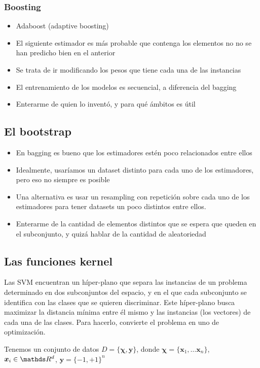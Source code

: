 \documentclass{article}
\begin{document}
\subsubsection{Boosting}
\begin{itemize}
 \item Adaboost (adaptive boosting)
 \item El siguiente estimador es más probable que contenga los elementos no
       no se han predicho bien en el anterior
 \item Se trata de ir modificando los pesos que tiene cada una de las instancias
 \item El entrenamiento de los modelos es secuencial, a diferencia del bagging
 \item Enterarme de quien lo inventó, y para qué ámbitos es útil
\end{itemize}
\subsection{El bootstrap}
\begin{itemize}
 \item En bagging es bueno que los estimadores estén poco relacionados
       entre ellos
 \item Idealmente, usaríamos un dataset distinto para cada uno de los
       estimadores, pero eso no siempre es posible
 \item Una alternativa es usar un resampling con repetición sobre cada
       uno de los estimadores para tener datasets un poco distintos entre ellos.
 \item Enterarme de la cantidad de elementos distintos que se espera que queden
       en el subconjunto, y quizá hablar de la cantidad de aleatoriedad
\end{itemize}
\subsection{Las funciones kernel}
Las SVM encuentran un híper-plano que separa las instancias de un problema
determinado en dos subconjuntos del espacio, y en el que cada subconjunto se
identifica con las clases que se quieren discriminar. Este híper-plano
busca maximizar la distancia mínima entre él mismo y las instancias (los vectores)
de cada una de las clases. Para hacerlo, convierte el problema en uno de
optimización.

Tenemos un conjunto de datos $D = \{\bm{\chi}, \bm{y}\}$, donde $\bm{\chi} = \{\bm{x}_1, \ldots \bm{x}_n\}$, $\bm{x}_i \in \reals^d$, $\bm{y} = \{-1, +1\}^n$
\end{document}
